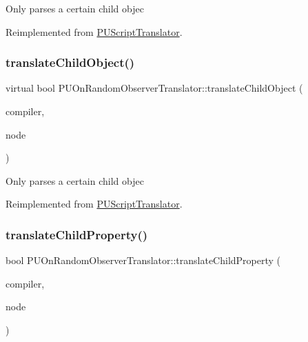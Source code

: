 Only parses a certain child objec 

Reimplemented from \hyperlink{classPUScriptTranslator_ab587d01348ae3e678cb700c719b2b113}{P\+U\+Script\+Translator}.

\mbox{\label{classPUOnRandomObserverTranslator_a09e3fe0070c74ce00dc9d6a93cc982a6}} 
\subsubsection{\texorpdfstring{translate\+Child\+Object()}{translateChildObject()}\hspace{0.1cm}{\footnotesize\ttfamily [2/2]}}
{\footnotesize\ttfamily virtual bool P\+U\+On\+Random\+Observer\+Translator\+::translate\+Child\+Object (\begin{DoxyParamCaption}\item[{\hyperlink{classPUScriptCompiler}{P\+U\+Script\+Compiler} $\ast$}]{compiler,  }\item[{\hyperlink{classPUAbstractNode}{P\+U\+Abstract\+Node} $\ast$}]{node }\end{DoxyParamCaption})\hspace{0.3cm}{\ttfamily [virtual]}}

Only parses a certain child objec 

Reimplemented from \hyperlink{classPUScriptTranslator_ab587d01348ae3e678cb700c719b2b113}{P\+U\+Script\+Translator}.

\mbox{\label{classPUOnRandomObserverTranslator_a33a307763b47576300326fd858593998}} 
\subsubsection{\texorpdfstring{translate\+Child\+Property()}{translateChildProperty()}\hspace{0.1cm}{\footnotesize\ttfamily [1/2]}}
{\footnotesize\ttfamily bool P\+U\+On\+Random\+Observer\+Translator\+::translate\+Child\+Property (\begin{DoxyParamCaption}\item[{\hyperlink{classPUScriptCompiler}{P\+U\+Script\+Compiler} $\ast$}]{compiler,  }\item[{\hyperlink{classPUAbstractNode}{P\+U\+Abstract\+Node} $\ast$}]{node }\end{DoxyParamCaption})\hspace{0.3cm}{\ttfamily [virtual]}}

